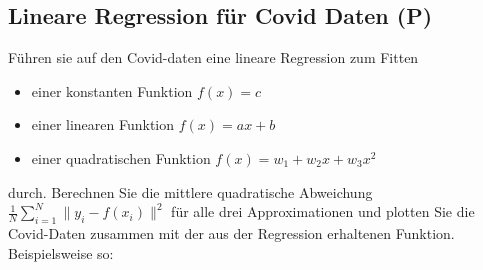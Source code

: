 \documentclass[]{book}
\providecommand{\tightlist}{%
  \setlength{\itemsep}{0pt}\setlength{\parskip}{0pt}}
\theoremstyle{definition}
\theoremstyle{definition}
\theoremstyle{definition}
\theoremstyle{definition}
\theoremstyle{remark}
\begin{document}
\hypertarget{lineare-regression-fuxfcr-covid-daten-p}{%
\subsection{Lineare Regression für Covid Daten (P)}\label{lineare-regression-fuxfcr-covid-daten-p}}

Führen sie auf den Covid-daten eine lineare Regression zum Fitten

\begin{itemize}
\tightlist
\item
  einer konstanten Funktion \(f(x)=c\)
\item
  einer linearen Funktion \(f(x) = ax+b\)
\item
  einer quadratischen Funktion \(f(x) = w_1 + w_2 x + w_3x^2\)
\end{itemize}

durch. Berechnen Sie die mittlere quadratische Abweichung \(\frac{1}{N}\sum_{i=1}^N\|y_i - f(x_i)\|^2\) für alle drei Approximationen und plotten Sie die Covid-Daten zusammen mit der aus der Regression erhaltenen Funktion. Beispielsweise so:
\end{document}
